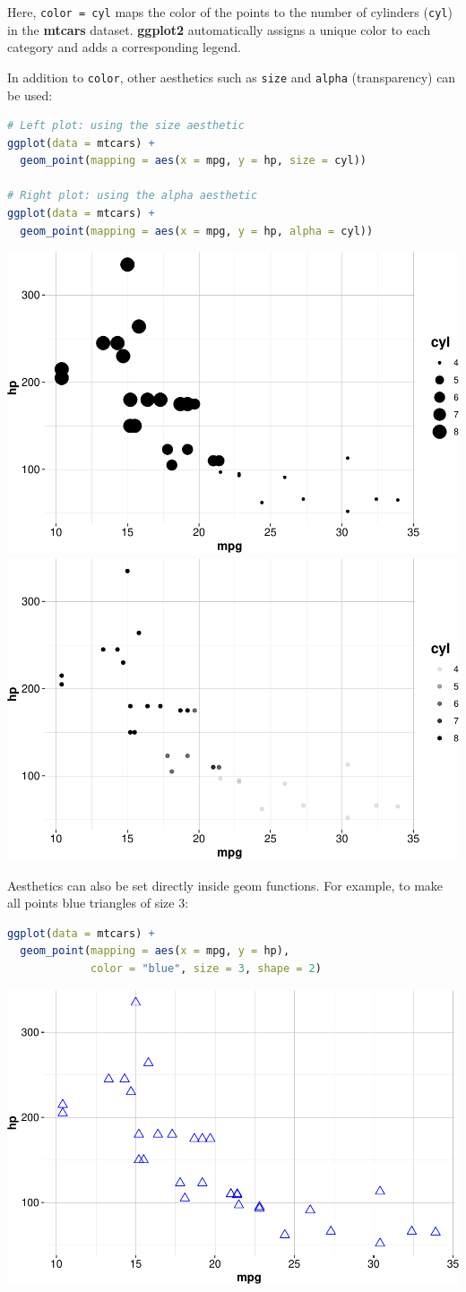 \documentclass[
]{book}
\newcommand{\passthrough}[1]{#1}
\theoremstyle{definition}
\theoremstyle{definition}
\theoremstyle{definition}
\theoremstyle{definition}
\theoremstyle{remark}
\begin{document}
Here, \passthrough{\lstinline!color = cyl!} maps the color of the points to the number of cylinders (\passthrough{\lstinline!cyl!}) in the \textbf{mtcars} dataset. \textbf{ggplot2} automatically assigns a unique color to each category and adds a corresponding legend.

In addition to \passthrough{\lstinline!color!}, other aesthetics such as \passthrough{\lstinline!size!} and \passthrough{\lstinline!alpha!} (transparency) can be used:

\begin{lstlisting}[language=R]
# Left plot: using the size aesthetic
ggplot(data = mtcars) +
  geom_point(mapping = aes(x = mpg, y = hp, size = cyl))

# Right plot: using the alpha aesthetic
ggplot(data = mtcars) +
  geom_point(mapping = aes(x = mpg, y = hp, alpha = cyl))
\end{lstlisting}

\includegraphics[width=0.5\linewidth]{Intro-R_files/figure-latex/unnamed-chunk-38-1} \includegraphics[width=0.5\linewidth]{Intro-R_files/figure-latex/unnamed-chunk-38-2}

Aesthetics can also be set directly inside geom functions. For example, to make all points blue triangles of size 3:

\begin{lstlisting}[language=R]
ggplot(data = mtcars) +
  geom_point(mapping = aes(x = mpg, y = hp), 
             color = "blue", size = 3, shape = 2)
\end{lstlisting}

\begin{center}\includegraphics[width=0.7\linewidth]{Intro-R_files/figure-latex/unnamed-chunk-39-1} \end{center}
\end{document}
